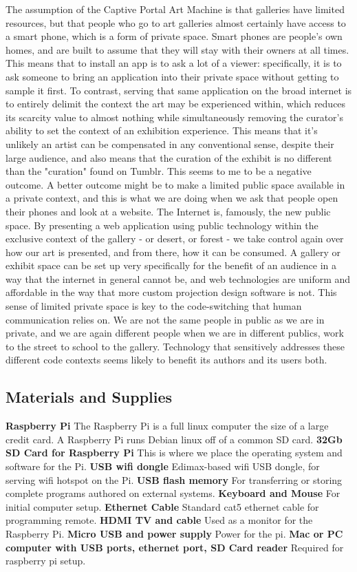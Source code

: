 The assumption of the Captive Portal Art Machine is that galleries have limited resources, but that people who go to art galleries almost certainly have access to a smart phone, which is a form of private space. Smart phones are people's own homes, and are built to assume that they will stay with their owners at all times. This means that to install an app is to ask a lot of a viewer: specifically, it is to ask someone to bring an application into their private space without getting to sample it first. To contrast, serving that same application on the broad internet is to entirely delimit the context the art may be experienced within, which reduces its scarcity value to almost nothing while simultaneously removing the curator's ability to set the context of an exhibition experience. This means that it's unlikely an artist can be compensated in any conventional sense, despite their large audience, and also means that the curation of the exhibit is no different than the "curation" found on Tumblr. This seems to me to be a negative outcome.
A better outcome might be to make a limited public space available in a private context, and this is what we are doing when we ask that people open their phones and look at a website. The Internet is, famously, the new public space. By presenting a web application using public technology within the exclusive context of the gallery - or desert, or forest - we take control again over how our art is presented, and from there, how it can be consumed. A gallery or exhibit space can be set up very specifically for the benefit of an audience in a way that the internet in general cannot be, and web technologies are uniform and affordable in the way that more custom projection design software is not.
This sense of limited private space is key to the code-switching that human communication relies on. We are not the same people in public as we are in private, and we are again different people when we are in different publics, work to the street to school to the gallery. Technology that sensitively addresses these different code contexts seems likely to benefit its authors and its users both.
 
 \subsection{Materials and Supplies}
\textbf{Raspberry Pi}
The Raspberry Pi is a full linux computer the size of a large credit card. A Raspberry Pi runs Debian linux off of a common SD card.
\textbf{32Gb SD Card for Raspberry Pi}
This is where we place the operating system and software for the Pi.
\textbf{USB wifi dongle}
Edimax-based wifi USB dongle, for serving wifi hotspot on the Pi.
\textbf{USB flash memory}
For transferring or storing complete programs authored on external systems.
\textbf{Keyboard and Mouse}
For initial computer setup.
\textbf{Ethernet Cable}
Standard cat5 ethernet cable for programming remote.
\textbf{HDMI TV and cable}
Used as a monitor for the Raspberry Pi.
\textbf{Micro USB and power supply}
Power for the pi.
\textbf{Mac or PC computer with USB ports, ethernet port, SD Card reader}
Required for raspberry pi setup.

